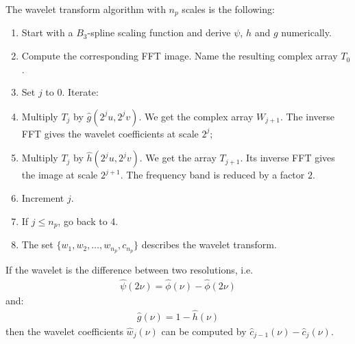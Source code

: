 \documentclass[11pt,a4paper]{article}
\begin{document}
The wavelet transform algorithm with $n_p$ scales is the following:
\begin{enumerate}
\item Start with a $B_3$-spline scaling function and derive $\psi$, $h$ and
$g$ numerically.
\item Compute the corresponding FFT image. 
Name the resulting complex array $T_0$.
\item Set $j$ to $0$. Iterate:
\item Multiply  $T_j$ by $\hat g(2^ju,2^jv)$. We get the complex array
$W_{j+1}$. The inverse FFT
gives the wavelet coefficients at scale $2^j$;
\item Multiply  $T_j$ by $\hat h(2^ju,2^jv)$. We get the array
$T_{j+1}$. Its inverse FFT gives the image at scale $2^{j+1}$.
The frequency band is reduced by a factor $2$.
\item Increment $j$.
\item If $j \leq  n_p$, go back to 4.
\item The set $\{w_1, w_2, \dots, w_{n_p}, c_{n_p}\}$ describes the
wavelet transform.
\end{enumerate}
If the wavelet is the difference between two resolutions, i.e.
\begin{eqnarray}
\hat \psi(2\nu) = \hat \phi(\nu) - \hat \phi(2\nu)
\end{eqnarray}
and:
\begin{eqnarray}
\hat g(\nu) = 1 - \hat h(\nu)
\end{eqnarray}
then the wavelet coefficients $\hat w_j(\nu)$ can be computed by 
$\hat c_{j-1}(\nu) - \hat c_j(\nu)$.
\end{document}
